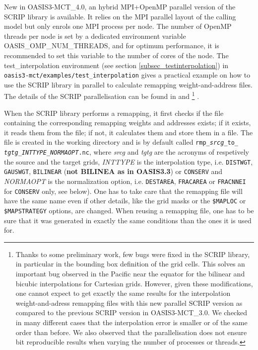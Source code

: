 \begin{itemize}
  New in OASIS3-MCT\_4.0, an hybrid MPI+OpenMP parallel version of the SCRIP library is available. It relies on the MPI parallel layout of the calling model but only enrols one MPI process per node. The number of OpenMP threads per node is set by a dedicated environment variable OASIS\_OMP\_NUM\_THREADS, and for optimum performance, it is recommended to set this variable to the number of cores of the node. The test\_interpolation environment (see section \ref{subsec_testinterpolation}) in {\tt oasis3-mct/examples/test\_interpolation} gives a practical example on how to use the SCRIP library in parallel to calculate remapping weight-and-address files. The details of the SCRIP parallelisation can be found in \cite{piacentini08} and \cite{valcke11}\footnote{Thanks to some preliminary work, few bugs were fixed in the SCRIP library, in particular in the bounding box definition of the grid cells. This solves an important bug observed in the Pacific near the equator for the bilinear and bicubic interpolations for Cartesian grids. However, given these modifications, one cannot expect to get exactly the same results for the interpolation weight-and-adress remapping files with this new parallel SCRIP version as compared to the previous SCRIP version in OASIS3-MCT\_3.0. We checked in many different cases that the interpolation error is smaller or of the same order than before. We also observed that the parallelisation does not ensure bit reproducible results when varying the number of processes or threads.} .

  When the SCRIP library performs a remapping, it first checks if the
  file containing the corresponding remapping weights and addresses
  exists; if it exists, it reads them from the file; if not, it
  calculates them and store them in a file. The file is created in the
  working directory and is by default called {\tt rmp\_{\it srcg}\_to\_{\it
      tgtg}\_{\it INTTYPE}\_{\it NORMAOPT}.nc}, where {\it srcg} and
  {\it tgtg} are the acronyms of respetively the source and the target
  grids, {\it INTTYPE} is the interpolation type, i.e. {\tt DISTWGT},
  {\tt GAUSWGT}, {\tt BILINEAR} ({\bf not BILINEA as in OASIS3.3}) or
  {\tt CONSERV} and {\it NORMAOPT} is the normalization
  option, i.e. {\tt DESTAREA}, {\tt FRACAREA} or {\tt FRACNNEI} for
  {\tt CONSERV} only, see below). One has to take care that the
  remapping file will have the same name even if other details, like
  the grid masks or the {\tt \$MAPLOC} or {\tt \$MAPSTRATEGY} options, 
  are changed. When reusing a remapping file, one has
  to be sure that it was generated in exactly the same conditions than
  the ones it is used for.


\end{itemize}
